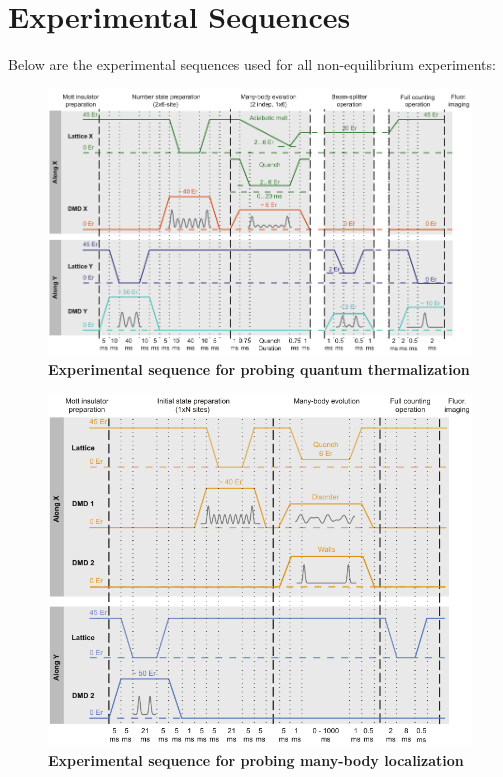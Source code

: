 
%


\chapter{Experimental Sequences}
\label{App:ExpSeq}

Below are the experimental sequences used for all non-equilibrium experiments:

\newpage

\begin{figure}[ht!]
		\includegraphics[width=\columnwidth]{figures/ch4/sequence_eth_v4.pdf} 
		\caption{\textbf{Experimental sequence for probing quantum thermalization}\cite{Kaufman2016} }
		\label{fig:eth_seq}	
\end{figure}

\newpage
\begin{figure}[ht!]
		\includegraphics[width=\columnwidth]{figures/ch5/sequence_MBL.pdf} 
		\caption{\textbf{Experimental sequence for probing many-body localization}\cite{Lukin2019} }
		\label{fig:MBL_seq}	
\end{figure}
